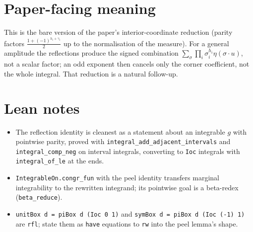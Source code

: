 \documentclass[11pt]{article}
\begin{document}
\section{Paper-facing meaning}
This is the bare version of the paper's interior-coordinate reduction (parity factors
$\frac{1+(-1)^{h_i+\gamma_i}}2$ up to the normalisation of the measure). For a general amplitude the
reflections produce the signed combination $\sum_\sigma\prod_i\sigma_i^{h_i}\eta(\sigma\cdot u)$, not a
scalar factor; an odd exponent then cancels only the corner coefficient, not the whole integral.
That reduction is a natural follow-up.

\section{Lean notes}
\begin{itemize}
\item The reflection identity is cleanest as a statement about an integrable $g$ with pointwise parity,
proved with \texttt{integral\_add\_adjacent\_intervals} and \texttt{integral\_comp\_neg} on interval
integrals, converting to \texttt{Ioc} integrals with \texttt{integral\_of\_le} at the ends.
\item \texttt{IntegrableOn.congr\_fun} with the peel identity transfers marginal integrability to the
rewritten integrand; its pointwise goal is a beta-redex (\texttt{beta\_reduce}).
\item \texttt{unitBox d = piBox d (Ioc 0 1)} and \texttt{symBox d = piBox d (Ioc (-1) 1)} are
\texttt{rfl}; state them as \texttt{have} equations to \texttt{rw} into the peel lemma's shape.
\end{itemize}
\end{document}
